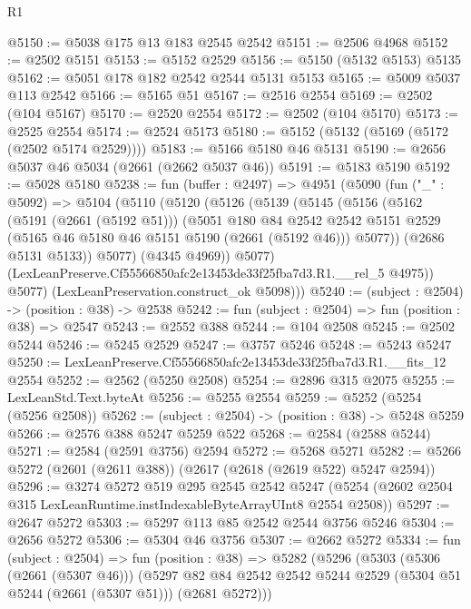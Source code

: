 \begin{lexlean}{R1}
\begin{coremodule}
@5150 := @5038 @175 @13 @183 @2545 @2542
@5151 := @2506 @4968
@5152 := @2502 @5151
@5153 := @5152 @2529
@5156 := @5150 (@5132 @5153) @5135
@5162 := @5051 @178 @182 @2542 @2544 @5131 @5153
@5165 := @5009 @5037 @113 @2542
@5166 := @5165 @51
@5167 := @2516 @2554
@5169 := @2502 (@104 @5167)
@5170 := @2520 @2554
@5172 := @2502 (@104 @5170)
@5173 := @2525 @2554
@5174 := @2524 @5173
@5180 := @5152 (@5132 (@5169 (@5172 (@2502 @5174 @2529))))
@5183 := @5166 @5180 @46 @5131
@5190 := @2656 @5037 @46 @5034 (@2661 (@2662 @5037 @46))
@5191 := @5183 @5190
@5192 := @5028 @5180
@5238 := fun (buffer : @2497) =>
  @4951
    (@5090
      (fun ("_" : @5092) =>
      @5104
        (@5110
          (@5120
            (@5126
              (@5139
                (@5145
                  (@5156
                    (@5162
                      (@5191 (@2661 (@5192 @51)))
                      (@5051
                        @180
                        @84
                        @2542
                        @2542
                        @5151
                        @2529
                        (@5165 @46 @5180 @46 @5151 @5190 (@2661 (@5192 @46)))
                        @5077))
                    (@2686 @5131 @5133))
                  @5077)
                (@4345 @4969))
              @5077)
            (LexLeanPreserve.Cf55566850afc2e13453de33f25fba7d3.R1.__rel_5 @4975))
          @5077)
        (LexLeanPreservation.construct_ok @5098)))
@5240 := (subject : @2504) -> (position : @38) -> @2538
@5242 := fun (subject : @2504) => fun (position : @38) => @2547
@5243 := @2552 @388
@5244 := @104 @2508
@5245 := @2502 @5244
@5246 := @5245 @2529
@5247 := @3757 @5246
@5248 := @5243 @5247
@5250 := LexLeanPreserve.Cf55566850afc2e13453de33f25fba7d3.R1.__fits_12 @2554
@5252 := @2562 (@5250 @2508)
@5254 := @2896 @315 @2075
@5255 := LexLeanStd.Text.byteAt
@5256 := @5255 @2554
@5259 := @5252 (@5254 (@5256 @2508))
@5262 := (subject : @2504) -> (position : @38) -> @5248 @5259
@5266 := @2576 @388 @5247 @5259 @522
@5268 := @2584 (@2588 @5244)
@5271 := @2584 (@2591 @3756) @2594
@5272 := @5268 @5271
@5282 := @5266 @5272 (@2601 (@2611 @388)) (@2617 (@2618 (@2619 @522) @5247 @2594))
@5296 := @3274
    @5272
    @519
    @295
    @2545
    @2542
    @5247
    (@5254 (@2602 @2504 @315 LexLeanRuntime.instIndexableByteArrayUInt8 @2554 @2508))
@5297 := @2647 @5272
@5303 := @5297 @113 @85 @2542 @2544 @3756 @5246
@5304 := @2656 @5272
@5306 := @5304 @46 @3756
@5307 := @2662 @5272
@5334 := fun (subject : @2504) =>
  fun (position : @38) =>
  @5282
    (@5296
      (@5303
        (@5306 (@2661 (@5307 @46)))
        (@5297 @82 @84 @2542 @2542 @5244 @2529 (@5304 @51 @5244 (@2661 (@5307 @51))) (@2681 @5272)))

\end{coremodule}
\end{lexlean}
